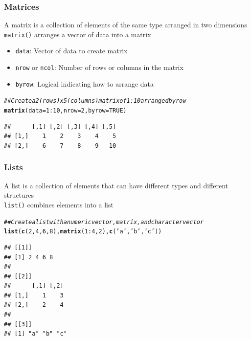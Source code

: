 \documentclass{beamer}\usepackage[]{graphicx}\usepackage[]{xcolor}
\makeatletter
\newcommand{\hlnum}[1]{\textcolor[rgb]{0.686,0.059,0.569}{#1}}%
\newcommand{\hlstr}[1]{\textcolor[rgb]{0.192,0.494,0.8}{#1}}%
\newcommand{\hlcom}[1]{\textcolor[rgb]{0.678,0.584,0.686}{\textit{#1}}}%
\newcommand{\hlopt}[1]{\textcolor[rgb]{0,0,0}{#1}}%
\newcommand{\hlstd}[1]{\textcolor[rgb]{0.345,0.345,0.345}{#1}}%
\newcommand{\hlkwc}[1]{\textcolor[rgb]{0.333,0.667,0.333}{#1}}%
\newcommand{\hlkwd}[1]{\textcolor[rgb]{0.737,0.353,0.396}{\textbf{#1}}}%
\newenvironment{kframe}{%
 \def\at@end@of@kframe{}%
 \ifinner\ifhmode%
  \def\at@end@of@kframe{\end{minipage}}%
  \begin{minipage}{\columnwidth}%
 \fi\fi%
 \def\FrameCommand##1{\hskip\@totalleftmargin \hskip-\fboxsep
 \colorbox{shadecolor}{##1}\hskip-\fboxsep
     \hskip-\linewidth \hskip-\@totalleftmargin \hskip\columnwidth}%
 \MakeFramed {\advance\hsize-\width
   \@totalleftmargin\z@ \linewidth\hsize
   \@setminipage}}%
 {\par\unskip\endMakeFramed%
 \at@end@of@kframe}
\newenvironment{knitrout}{}{} %
\makeatother
\begin{document}
\begin{frame}[fragile]\frametitle{Matrices}
    A matrix is a collection of elements of the same type arranged in two dimensions \\
    \vspace{3ex}
    \texttt{matrix()} arranges a vector of data into a matrix
    \begin{itemize}
        \item \texttt{data}: Vector of data to create matrix
        \item \texttt{nrow} or \texttt{ncol}: Number of rows or columns in the matrix
        \item \texttt{byrow}: Logical indicating how to arrange data
    \end{itemize}
\begin{knitrout}\footnotesize
{}\color{fgcolor}\begin{kframe}
\begin{alltt}
\hlcom{## Create a 2 (rows) x 5 (columns) matrix of 1:10 arranged by row}
\hlkwd{matrix}\hlstd{(}\hlkwc{data} \hlstd{=} \hlnum{1}\hlopt{:}\hlnum{10}\hlstd{,} \hlkwc{nrow} \hlstd{=} \hlnum{2}\hlstd{,} \hlkwc{byrow} \hlstd{=} \hlnum{TRUE}\hlstd{)}
\end{alltt}
\begin{verbatim}
##      [,1] [,2] [,3] [,4] [,5]
## [1,]    1    2    3    4    5
## [2,]    6    7    8    9   10
\end{verbatim}
\end{kframe}
\end{knitrout}
\end{frame}

\begin{frame}[fragile]\frametitle{Lists}
    A list is a collection of elements that can have different types and different structures \\
    \vspace{3ex}
    \texttt{list()} combines elements into a list
\begin{knitrout}\footnotesize
{}\color{fgcolor}\begin{kframe}
\begin{alltt}
\hlcom{## Create a list with a numeric vector, matrix, and character vector}
\hlkwd{list}\hlstd{(}\hlkwd{c}\hlstd{(}\hlnum{2}\hlstd{,} \hlnum{4}\hlstd{,} \hlnum{6}\hlstd{,} \hlnum{8}\hlstd{),} \hlkwd{matrix}\hlstd{(}\hlnum{1}\hlopt{:}\hlnum{4}\hlstd{,} \hlnum{2}\hlstd{),} \hlkwd{c}\hlstd{(}\hlstr{'a'}\hlstd{,} \hlstr{'b'}\hlstd{,} \hlstr{'c'}\hlstd{))}
\end{alltt}
\begin{verbatim}
## [[1]]
## [1] 2 4 6 8
## 
## [[2]]
##      [,1] [,2]
## [1,]    1    3
## [2,]    2    4
## 
## [[3]]
## [1] "a" "b" "c"
\end{verbatim}
\end{kframe}
\end{knitrout}
\end{frame}
\end{document}
